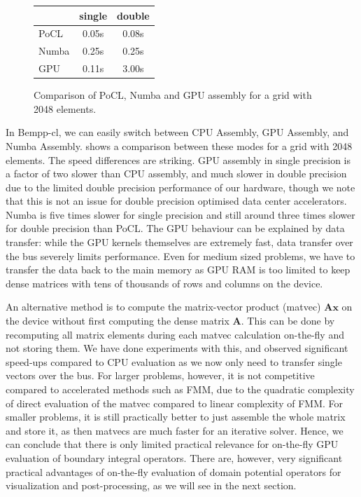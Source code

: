 \documentclass{IEEEcsmag}
\newcommand{\dmat}[1]{\mathbf{#1}}
\newcommand{\dvec}[1]{\mathbf{#1}}
\begin{document}
\begin{figure}
	\begin{center}
		\begin{tabular}{l|c|c}
			&   single      &    double\\
			\hline
			PoCL   &   0.05s       &    0.08s\\
			Numba  &   0.25s       &    0.25s\\
			GPU    &   0.11s       &    3.00s\\
		\end{tabular}
	\end{center}
	\caption{Comparison of PoCL, Numba and GPU assembly for a grid with 2048 elements.}
	\label{fig:cpu_gpu_numba_compare}
\end{figure}
In Bempp-cl, we can easily switch between CPU Assembly, GPU Assembly, and Numba Assembly.  shows a comparison between these modes for a grid with 2048 elements. The speed differences are striking. GPU assembly in single precision is a factor of two slower than CPU assembly, and much slower in double precision due to the limited double precision performance of our hardware, though we note that this is not an issue for double precision optimised data center accelerators. Numba is five times slower for single precision and still around three times slower for double precision than PoCL. The GPU behaviour can be explained by data transfer: while the GPU kernels themselves are extremely fast, data transfer over the bus severely limits performance. Even for medium sized problems, we have to transfer the data back to the main memory as GPU RAM is too limited to keep dense matrices with tens of thousands of rows and columns on the device.

An alternative method is to compute the matrix-vector product (matvec) $\dmat{A}\dvec{x}$ on the device without first computing the dense matrix $\dmat{A}$. This can be done by recomputing all matrix elements during each matvec calculation on-the-fly and not storing them. We have done experiments with this, and observed significant speed-ups compared to CPU evaluation as we now only need to transfer single vectors over the bus. For larger problems, however, it is not competitive compared to accelerated methods such as FMM, due to the quadratic complexity of direct evaluation of the matvec compared to linear complexity of FMM. For smaller problems, it is still practically better to just assemble the whole matrix and store it, as then matvecs are much faster for an iterative solver. Hence, we can conclude that there is only limited practical relevance for on-the-fly GPU evaluation of boundary integral operators. There are, however, very significant practical advantages of on-the-fly evaluation of domain potential operators for visualization and post-processing, as we will see in the next section.
\end{document}
